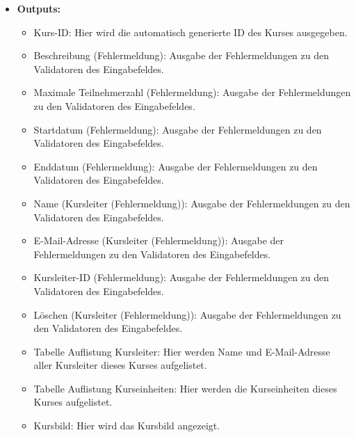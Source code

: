 \begin{itemize}
			\item \textbf{Outputs:}
				\begin{itemize}
					\item Kurs-ID: Hier wird die automatisch generierte ID des Kurses ausgegeben.
					\item Beschreibung (Fehlermeldung): Ausgabe der Fehlermeldungen zu den Validatoren des Eingabefeldes.
					\item Maximale Teilnehmerzahl (Fehlermeldung): Ausgabe der Fehlermeldungen zu den Validatoren des Eingabefeldes.
					\item Startdatum (Fehlermeldung): Ausgabe der Fehlermeldungen zu den Validatoren des Eingabefeldes.
					\item Enddatum (Fehlermeldung): Ausgabe der Fehlermeldungen zu den Validatoren des Eingabefeldes.
					\item Name (Kursleiter (Fehlermeldung)): Ausgabe der Fehlermeldungen zu den Validatoren des Eingabefeldes.
					\item E-Mail-Adresse (Kursleiter (Fehlermeldung)): Ausgabe der Fehlermeldungen zu den Validatoren des Eingabefeldes.
					\item Kursleiter-ID (Fehlermeldung): Ausgabe der Fehlermeldungen zu den Validatoren des Eingabefeldes.
					\item Löschen (Kursleiter (Fehlermeldung)): Ausgabe der Fehlermeldungen zu den Validatoren des Eingabefeldes.
					\item Tabelle Auflistung Kursleiter: Hier werden Name und E-Mail-Adresse aller Kursleiter dieses Kurses aufgelistet.
					\item Tabelle Auflistung Kurseinheiten: Hier werden die Kurseinheiten dieses Kurses aufgelistet.
					\item Kursbild: Hier wird das Kursbild angezeigt.
				\end{itemize}
				
				\begin{center}
					\begin{longtable}{|p{5cm} | p{4cm}|p{3cm}|}
						

\end{longtable}
\end{center}
\end{itemize}
